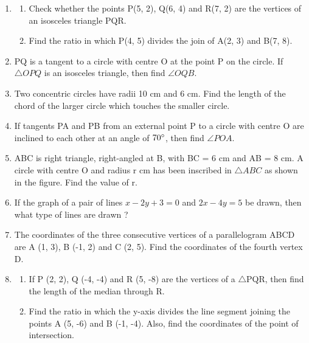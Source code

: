 \documentclass{article}
\begin{document}
\begin{enumerate}
		\item
		\begin{enumerate}
			\item Check whether the points P(5, 2), Q(6, 4) and R(7, 2) are the vertices of an isosceles triangle PQR.

			\item Find the ratio in which P(4, 5) divides the join of A(2, 3) and B(7, 8). 
		\end{enumerate}

		\item PQ is a tangent to a circle with centre O at the point P on the circle. If $\triangle OPQ$ is an isosceles triangle, then find $\angle OQB$. 
		
		\item Two concentric circles have radii 10 cm and 6 cm. Find the length of the chord of the larger circle which touches the smaller circle. 
		
		\item If tangents PA and PB from an external point P to a circle with centre O are inclined to each other at an angle of $70\degree$, then find $\angle POA$. 
		
		\item ABC is right triangle, right-angled at B, with BC = 6 cm and AB = 8 cm. A circle with centre O and radius r cm has been inscribed in $\triangle ABC$ as shown in the figure. Find the value of r. 
		

		\item If the graph of a pair of lines $x - 2y + 3 = 0$ and $2x - 4y = 5$ be drawn, then what type of lines are drawn ? 
		
		\item The coordinates of the three consecutive vertices of a parallelogram ABCD are A (1, 3), B (-1, 2) and C (2, 5). Find the coordinates of the fourth vertex D. 
		
		\item
		\begin{enumerate}
			\item If P (2, 2), Q (-4, -4) and R (5, -8) are the vertices of a  $\triangle$PQR, then find the length of the median through R.

			\item Find the ratio in which the y-axis divides the line segment joining the points A (5, -6) and B (-1, -4). Also, find the coordinates of the point of intersection.
		\end{enumerate}
		

\end{enumerate}
\end{document}
